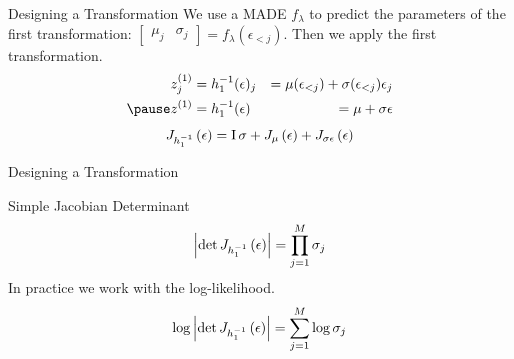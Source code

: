 \documentclass[14pt]{beamer}
\begin{document}
\begin{frame}{Designing a Transformation}
We use a MADE $ f_{\lambda} $ to predict the parameters of the first transformation: $ \begin{bmatrix} \mu_{j} & \sigma_{j} \end{bmatrix} =  f_{\lambda}(\epsilon_{<j}) $.
Then we apply the first transformation.
\begin{equation*}
\begin{aligned}
z^{(1)}_{j} &= h^{-1}_{1}(\epsilon)_{j} &= \mu(\epsilon_{<j}) + \sigma(\epsilon_{<j}) \epsilon_{j} \\ \pause
z^{(1)} &= h^{-1}_{1}(\epsilon) &= \mu + \sigma \epsilon
\end{aligned}
\end{equation*}
\pause
\begin{equation*}
J_{h^{-1}_{1}}\left(\epsilon\right) = \operatorname{I} \sigma + J_{\mu}\left(\epsilon\right) +J_{\sigma \epsilon}\left(\epsilon\right)
\end{equation*}
\end{frame}

\begin{frame}{Designing a Transformation}
\begin{block}{Simple Jacobian Determinant}
\begin{equation*}
\left|\det J_{h^{-1}_{1}}\left(\epsilon\right)\right| = \prod_{j=1}^{M}\sigma_{j}
\end{equation*}
In practice we work with the log-likelihood.
\begin{equation*}
\log\left|\det J_{h^{-1}_{1}}\left(\epsilon\right)\right| = \sum_{j=1}^{M}\log\sigma_{j}
\end{equation*}
\end{block}
\end{frame}
\end{document}
